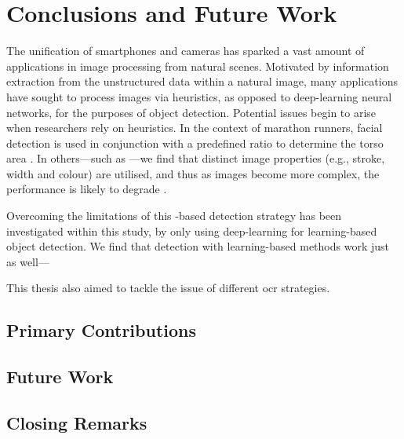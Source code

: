 \chapter{Conclusions and Future Work}
\label{ch:conclusion}

The unification of smartphones and cameras has sparked a vast amount of applications in image processing from natural scenes. Motivated by information extraction from the unstructured data within a natural image, many applications have sought to process images via heuristics, as opposed to deep-learning neural networks, for the purposes of object detection. Potential issues begin to arise when researchers rely on heuristics. In the context of marathon runners,  facial detection is used in conjunction with a predefined ratio to determine the torso area \citep{Benami:2012jf}. In others---such as ---we find that distinct image properties (e.g., stroke, width and colour) are utilised, and thus as images become more complex, the performance is likely to degrade \citep{Li:2012wd}.

Overcoming the limitations of this -based detection strategy has been investigated within this study, by only using deep-learning  for learning-based object detection. We find that detection with learning-based methods work just as well---%

This thesis also aimed to tackle the issue of different \gls{ocr} strategies. 

\section{Primary Contributions}



\section{Future Work}




\section{Closing Remarks}

